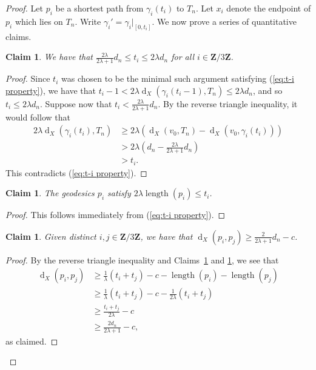 \documentclass[11pt,a4paper]{amsart}
\DeclareMathOperator{\length}{length}
\DeclareMathOperator{\dist}{d}
\newcommand{\Z}{\mathbf{Z}}
\newtheorem{claim}[theorem]{Claim}
\theoremstyle{definition}
\begin{document}
\begin{proof}
    Let $p_i$ be a shortest path from $\gamma_i(t_i)$ to $T_n$. 
    Let $x_i$ denote the endpoint of $p_i$ which lies on $T_n$. 
    Write $\gamma_i' = \gamma_i|_{[0,t_i]}$. 
    We now prove a series of quantitative claims.

    \begin{claim}\label{claim:bound-on-ti}
        We have that 
        $
        \frac {2\lambda}{2\lambda+1} d_n \leq t_i \leq 2\lambda d_n
        $
        for all $i \in \Z/3\Z$. 
    \end{claim}

    \begin{proof}
        Since $t_i$ was chosen to be the minimal such argument satisfying (\ref{eq:t-i property}), we have that
        $
        t_i-1 < 2\lambda \dist_X(\gamma_i(t_i-1), T_n) \leq 2\lambda d_n
        $, 
        and so $t_i \leq 2\lambda d_n$. 
        Suppose now that $t_i < \frac {2\lambda}{2\lambda+1} d_n$. By the reverse triangle inequality, it would follow that 
        \begin{align*}
            2\lambda\dist_X(\gamma_i(t_i), T_n) &\geq 2\lambda (\dist_X(v_0, T_n) - \dist_X(v_0,\gamma_i(t_i)) )\\
            &> 2\lambda (d_n - \frac {2\lambda}{2\lambda+1} d_n) \\
            &> t_i.
        \end{align*}
        This contradicts (\ref{eq:t-i property}). 
    \end{proof}


    \begin{claim}\label{claim:bound-on-pi-length}
        The geodesics $p_i$ satisfy $2\lambda\length(p_i) \leq  t_i$.
    \end{claim}

    \begin{proof}
        This follows immediately from (\ref{eq:t-i property}).
    \end{proof}


    \begin{claim}\label{claim:bound-on-pi-dist}
        Given distinct $i , j \in \Z/3\Z$, we have that $\dist_X(p_i,p_j) \geq \frac 2{2\lambda+1} d_n - c$. 
    \end{claim}

    \begin{proof}
        By the reverse triangle inequality and Claims~\ref{claim:bound-on-ti} and \ref{claim:bound-on-pi-length}, we see that 
        \begin{align*}
            \dist_X(p_i,p_j) &\geq \frac 1 \lambda (t_i + t_j) - c - \length(p_i) - \length(p_j) \\
            &\geq \frac 1 \lambda (t_i + t_j) - c  - \frac 1 {2\lambda }(t_i + t_j)\\
            & \geq \frac{t_i + t_j}{2\lambda} - c \\
            & \geq \frac{2d_n}{2\lambda + 1} - c,
        \end{align*}
        as claimed.
    \end{proof}


\end{proof}
\end{document}
